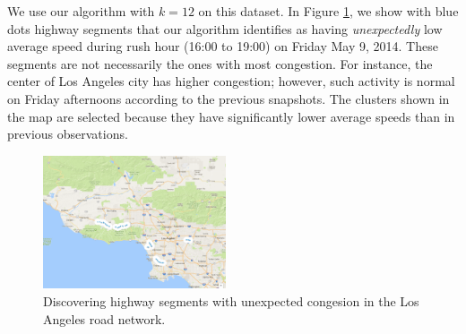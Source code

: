We use our algorithm with $k=12$ on this dataset. In Figure \ref{fig:traffic}, we show with blue dots highway segments that our algorithm identifies as having \emph{unexpectedly} low average speed during rush hour (16:00 to 19:00) on Friday May 9, 2014. These segments are not necessarily the ones with most congestion. For instance, the center of Los Angeles city has higher congestion; however, such activity is normal on Friday afternoons according to the previous snapshots. The clusters shown in the map are selected because they have significantly lower average speeds than in previous observations.  

\begin{figure}[!htpb]
\includegraphics[width=0.48\textwidth]{img/traffic-example.png}
\caption{Discovering highway segments with unexpected congesion in the Los Angeles road network.}
\label{fig:traffic}
\end{figure}

